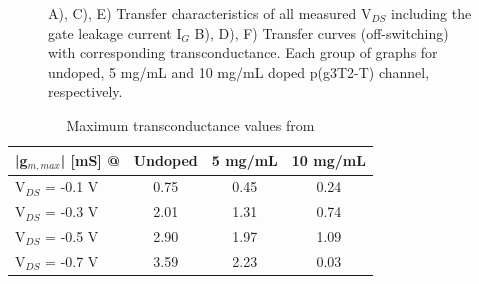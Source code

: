 \begin{figure}[!ht]
    \caption[Transfer characteristics and transconductance at different doping levels and V$_{DS}$]{A), C), E) Transfer characteristics of all measured V$_{DS}$ including the gate leakage current I$_{G}$ B), D), F) Transfer curves (off-switching) with corresponding transconductance. Each group of graphs for undoped, 5 mg/mL and 10 mg/mL doped p(g3T2-T) channel, respectively.}
    \label{fig:transx2}
\end{figure}



\begin{table}[ht]
\centering
\caption{Maximum transconductance values from }
\begin{tabular}{l|c|c|c}
|g$_{m,max}$| [mS] @ & Undoped & 5 mg/mL & 10 mg/mL \\\hline
V$_{DS}$ = -0.1 V & 0.75 & 0.45 & 0.24\\
V$_{DS}$ = -0.3 V & 2.01 & 1.31 & 0.74\\
V$_{DS}$ = -0.5 V & 2.90 & 1.97 & 1.09\\
V$_{DS}$ = -0.7 V & 3.59 & 2.23 & 0.03\\ \hline
\end{tabular}
\label{tab:fom}
\end{table}


